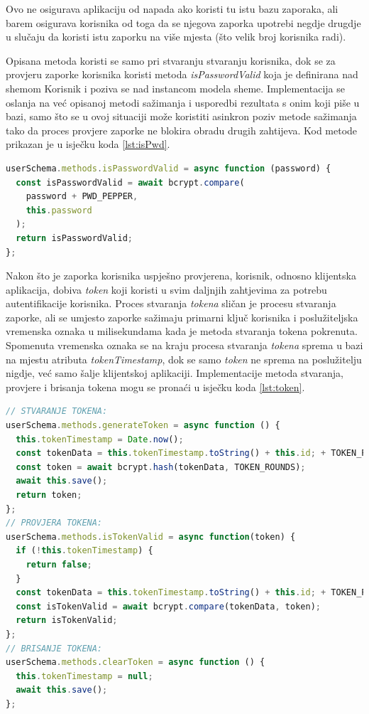\documentclass[times, utf8, diplomski, numeric]{fer}
\newcommand{\razmakp}{\vspace{18pt}}
\newcommand{\razmaks}{\vspace{10pt}}
\begin{document}
Ovo ne osigurava aplikaciju od napada ako koristi tu istu bazu zaporaka, ali barem osigurava korisnika od toga da se njegova zaporka upotrebi negdje drugdje u slučaju da koristi istu zaporku na više mjesta (što velik broj korisnika radi).

\razmakp

Opisana metoda koristi se samo pri stvaranju stvaranju korisnika, dok se za provjeru zaporke korisnika koristi metoda \emph{isPasswordValid} koja je definirana nad shemom Korisnik i poziva se nad instancom modela sheme.
Implementacija se oslanja na već opisanoj metodi sažimanja i usporedbi rezultata s onim koji piše u bazi, samo što se u ovoj situaciji može koristiti asinkron poziv metode sažimanja tako da proces provjere zaporke ne blokira obradu drugih zahtijeva. 
Kod metode prikazan je u isječku koda \ref{lst:isPwd}.

\razmakp %
\begin{lstlisting}[language=JavaScript, caption={Metoda \emph{isPasswordValid} sheme Korisnik}, label={lst:isPwd}]
userSchema.methods.isPasswordValid = async function (password) {
  const isPasswordValid = await bcrypt.compare(
    password + PWD_PEPPER,
    this.password
  );
  return isPasswordValid;
};
\end{lstlisting}
\razmaks

Nakon što je zaporka korisnika uspješno provjerena, korisnik, odnosno klijentska aplikacija, dobiva \emph{token} koji koristi u svim daljnjih zahtjevima za potrebu autentifikacije korisnika.
Proces stvaranja \emph{tokena} sličan je procesu stvaranja zaporke, ali se umjesto zaporke sažimaju primarni ključ korisnika i poslužiteljska vremenska oznaka  u milisekundama kada je metoda stvaranja tokena pokrenuta.
Spomenuta vremenska oznaka se na kraju procesa stvaranja \emph{tokena} sprema u bazi na mjestu atributa \emph{tokenTimestamp}, dok se samo \emph{token} ne sprema na poslužitelju nigdje, već samo šalje klijentskoj aplikaciji.
Implementacije metoda stvaranja, provjere i brisanja tokena mogu se pronaći u isječku koda \ref{lst:token}.

\razmakp %
\begin{lstlisting}[language=JavaScript, caption={Metode stvaranja, provjere i brisanja tokena sheme Korisnik}, label={lst:token}]
// STVARANJE TOKENA:
userSchema.methods.generateToken = async function () {
  this.tokenTimestamp = Date.now();
  const tokenData = this.tokenTimestamp.toString() + this.id; + TOKEN_PEPPER;
  const token = await bcrypt.hash(tokenData, TOKEN_ROUNDS);
  await this.save();
  return token;
};
// PROVJERA TOKENA:
userSchema.methods.isTokenValid = async function(token) {
  if (!this.tokenTimestamp) {
    return false;
  }
  const tokenData = this.tokenTimestamp.toString() + this.id; + TOKEN_PEPPER;
  const isTokenValid = await bcrypt.compare(tokenData, token);
  return isTokenValid;
};
// BRISANJE TOKENA:
userSchema.methods.clearToken = async function () {
  this.tokenTimestamp = null;
  await this.save();
};
\end{lstlisting}
\razmaks
\end{document}
